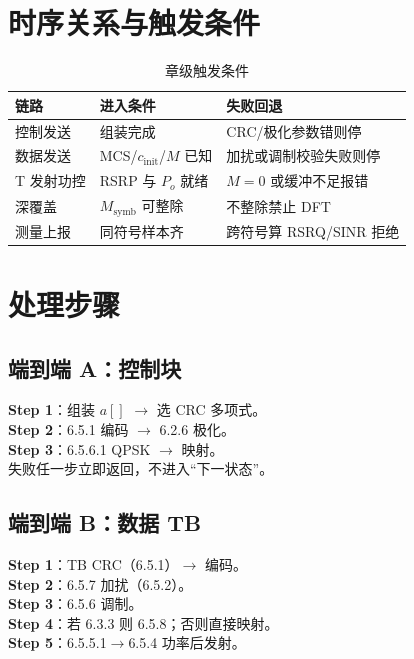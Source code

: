 \documentclass[11pt,a4paper]{ctexart}
\begin{document}
\section{时序关系与触发条件}

\begin{longtable}{L{3.2cm}L{5.8cm}L{5cm}}
\caption{章级触发条件\label{tab:65-trig}} \\
\toprule
\textbf{链路} & \textbf{进入条件} & \textbf{失败回退} \\
\midrule
控制发送 & 组装完成 & CRC/极化参数错则停 \\
数据发送 & MCS/$c_{\mathrm{init}}$/$M$ 已知 & 加扰或调制校验失败则停 \\
T 发射功控 & RSRP 与 $P_o$ 就绪 & $M{=}0$ 或缓冲不足报错 \\
深覆盖 & $M_{\mathrm{symb}}$ 可整除 & 不整除禁止 DFT \\
测量上报 & 同符号样本齐 & 跨符号算 RSRQ/SINR 拒绝 \\
\bottomrule
\end{longtable}

\section{处理步骤}

\subsection{端到端 A：控制块}

\textbf{Step 1}：组装 $a[]$ $\rightarrow$ 选 CRC 多项式。\\
\textbf{Step 2}：6.5.1 编码 $\rightarrow$ 6.2.6 极化。\\
\textbf{Step 3}：6.5.6.1 QPSK $\rightarrow$ 映射。\\
失败任一步立即返回，不进入``下一状态''。

\subsection{端到端 B：数据 TB}

\textbf{Step 1}：TB CRC（6.5.1）$\rightarrow$ 编码。\\
\textbf{Step 2}：6.5.7 加扰（6.5.2）。\\
\textbf{Step 3}：6.5.6 调制。\\
\textbf{Step 4}：若 6.3.3 则 6.5.8；否则直接映射。\\
\textbf{Step 5}：6.5.5.1$\rightarrow$6.5.4 功率后发射。
\end{document}
